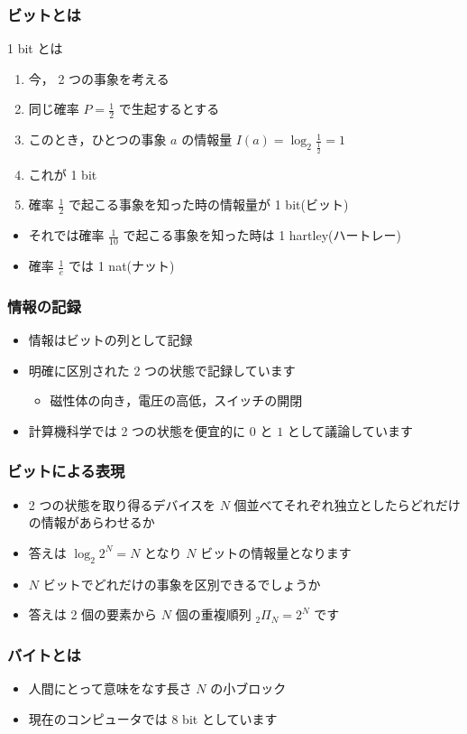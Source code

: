 \begin{frame}
\frametitle{ビットとは}
  \begin{block}{1 bit とは}
    \begin{enumerate}
\item 今， 2 つの事象を考える
\item 同じ確率 \(P=\frac{1}{2}\) で生起するとする
\item このとき，ひとつの事象 $a$ の情報量 \(I(a)=\log_2\frac{1}{\frac{1}{2}}=1\)
\item これが 1 bit
\item 確率 \(\frac{1}{2}\) で起こる事象を知った時の情報量が 1 bit(ビット)
    \end{enumerate}
  \end{block}
  \begin{itemize}
\item それでは確率 \(\frac{1}{10}\) で起こる事象を知った時は 1 hartley(ハートレー)
\item 確率 \(\frac{1}{e}\) では 1 nat(ナット)
  \end{itemize}
\end{frame}
\begin{frame}
\frametitle{情報の記録}
  \begin{itemize}
\item 情報はビットの列として記録
\item 明確に区別された 2 つの状態で記録しています
    \begin{itemize}
\item 磁性体の向き，電圧の高低，スイッチの開閉
    \end{itemize}
\item 計算機科学では 2 つの状態を便宜的に $0$ と $1$ として議論しています
  \end{itemize}
\end{frame}
\begin{frame}
\frametitle{ビットによる表現}
  \begin{itemize}
\item 2 つの状態を取り得るデバイスを $N$ 個並べてそれぞれ独立としたらどれだけの情報があらわせるか
\item 答えは \(\log_2 2^N=N\) となり $N$ ビットの情報量となります
\item $N$ ビットでどれだけの事象を区別できるでしょうか
\item 答えは 2 個の要素から $N$ 個の重複順列 \({ }_2\Pi_N=2^N\) です
  \end{itemize}
\end{frame}
\begin{frame}
\frametitle{バイトとは}
  \begin{itemize}
\item 人間にとって意味をなす長さ $N$ の小ブロック
\item 現在のコンピュータでは 8 bit としています
  \end{itemize}
\end{frame}
%
%
